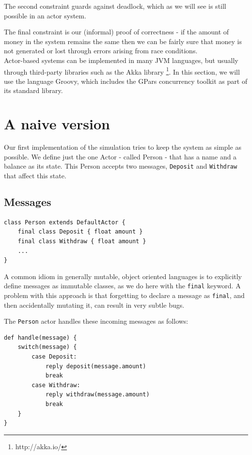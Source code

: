 \documentclass[a4paper,12pt]{kth-mag}
\begin{document}
The second constraint guards against deadlock, which as we will see is still possible in an actor system.

The final constraint is our (informal) proof of correctness - if the amount of money in the system remains the same then we can be fairly sure that money is not generated or lost through errors arising from race conditions. \\

Actor-based systems can be implemented in many JVM languages, but usually through third-party libraries such as the Akka library \footnote{http://akka.io/}. In this section, we will use the language Groovy, which includes the GPars concurrency toolkit as part of its standard library.

\section{A naive version}

Our first implementation of the simulation tries to keep the system as simple as possible. We define just the one Actor - called Person - that has a name and a balance as its state. This Person accepts two messages, \texttt{Deposit} and \texttt{Withdraw} that affect this state. 

\subsection{Messages}

\begin{listing}[H]
	\begin{verbatim}
class Person extends DefaultActor {
    final class Deposit { float amount }
    final class Withdraw { float amount }
    ...
}
	\end{verbatim}
\end{listing}

A common idiom in generally mutable, object oriented languages is to explicitly define messages as immutable classes, as we do here with the \texttt{final} keyword. A problem with this approach is that forgetting to declare a message as \texttt{final}, and then accidentally mutating it, can result in very subtle bugs.

The \texttt{Person} actor handles these incoming messages as follows:

\begin{listing}[H]
	\begin{verbatim}
def handle(message) { 
    switch(message) {
        case Deposit:
            reply deposit(message.amount)
            break
        case Withdraw: 
            reply withdraw(message.amount)
            break
    }
}
	\end{verbatim}
\end{listing}
\end{document}
